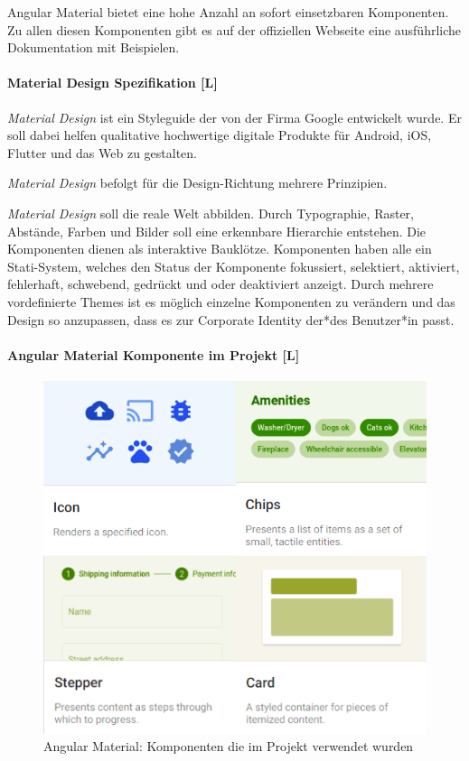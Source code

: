 Angular Material bietet eine hohe Anzahl an sofort einsetzbaren Komponenten. Zu allen diesen Komponenten gibt es auf der offiziellen Webseite eine ausführliche Dokumentation mit Beispielen. \cite{JavaPointAngularMaterial, WhatAngularMaterial}

\paragraph{Material Design Spezifikation [L]}
\emph{Material Design} ist ein Styleguide der von der Firma Google entwickelt wurde. Er soll dabei helfen qualitative hochwertige digitale Produkte für Android, iOS, Flutter und das Web zu gestalten.

\emph{Material Design} befolgt für die Design-Richtung mehrere Prinzipien. 

\emph{Material Design} soll die reale Welt abbilden.
Durch Typographie, Raster, Abstände, Farben und Bilder soll eine erkennbare Hierarchie entstehen. Die Komponenten dienen als interaktive Bauklötze. Komponenten haben alle ein Stati-System, welches den Status der Komponente fokussiert, selektiert, aktiviert, fehlerhaft, schwebend, gedrückt und oder deaktiviert anzeigt. Durch mehrere vordefinierte Themes ist es möglich einzelne Komponenten zu verändern und das Design so anzupassen, dass es zur Corporate Identity der*des Benutzer*in passt.\cite{MaterialDesign-Introduction}

\paragraph{Angular Material Komponente im Projekt [L]}

\begin{figure}
  \centering
  \includegraphics[scale=0.5]{pics/AngularMaterialKomponent.png}
  \caption{Angular Material: Komponenten die im Projekt verwendet wurden \cite{AngularComponents}}
  \label{architecture:frontend:angular-material-project-components}
\end{figure}

